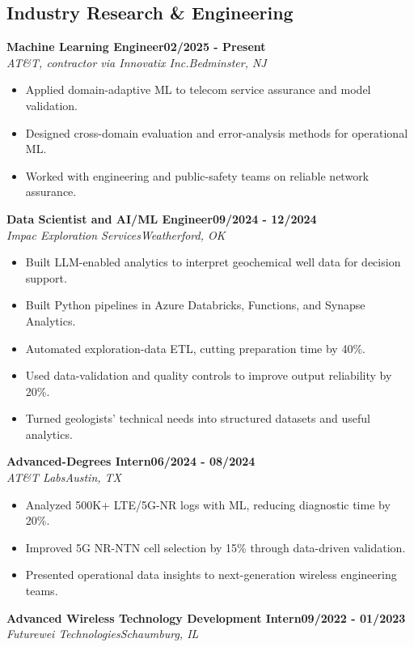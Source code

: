 \documentclass[10pt,letterpaper]{extarticle}
\newcommand{\role}[4]{%
  \Needspace{4\baselineskip}\textbf{#1}\hfill\textbf{#2}\\[-1pt]
  \textit{#3}\hfill\textit{#4}\par}
\begin{document}
\subsection{Industry Research \& Engineering}
\role{Machine Learning Engineer}{02/2025 - Present}{AT\&T, contractor via Innovatix Inc.}{Bedminster, NJ}
\begin{itemize}
\item Applied domain-adaptive ML to telecom service assurance and model validation.
\item Designed cross-domain evaluation and error-analysis methods for operational ML.
\item Worked with engineering and public-safety teams on reliable network assurance.
\end{itemize}
\vspace{1pt}
\role{Data Scientist and AI/ML Engineer}{09/2024 - 12/2024}{Impac Exploration Services}{Weatherford, OK}
\begin{itemize}
\item Built LLM-enabled analytics to interpret geochemical well data for decision support.
\item Built Python pipelines in Azure Databricks, Functions, and Synapse Analytics.
\item Automated exploration-data ETL, cutting preparation time by 40\%.
\item Used data-validation and quality controls to improve output reliability by 20\%.
\item Turned geologists' technical needs into structured datasets and useful analytics.
\end{itemize}
\vspace{1pt}
\role{Advanced-Degrees Intern}{06/2024 - 08/2024}{AT\&T Labs}{Austin, TX}
\begin{itemize}
\item Analyzed 500K+ LTE/5G-NR logs with ML, reducing diagnostic time by 20\%.
\item Improved 5G NR-NTN cell selection by 15\% through data-driven validation.
\item Presented operational data insights to next-generation wireless engineering teams.
\end{itemize}
\vspace{1pt}
\role{Advanced Wireless Technology Development Intern}{09/2022 - 01/2023}{Futurewei Technologies}{Schaumburg, IL}
\end{document}
